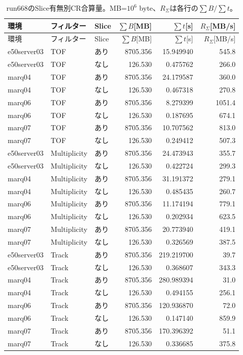 \begingroup\small\begin{longtable}{lllrrr}
\caption{run668のSlice有無別CR合算量。MB=$10^6$ byte、$R_\Sigma$は各行の$\sum B/\sum t$。}\\
\hline 環境 & フィルター & Slice & $\sum B$[MB] & $\sum t$[s] & $R_\Sigma$[MB/s] \\\hline\endfirsthead
\hline 環境 & フィルター & Slice & $\sum B$[MB] & $\sum t$[s] & $R_\Sigma$[MB/s] \\\hline\endhead
e50server03 & TOF & あり & 8705.356 & 15.949940 & 545.8 \\
e50server03 & TOF & なし & 126.530 & 0.475762 & 266.0 \\
marq04 & TOF & あり & 8705.356 & 24.179587 & 360.0 \\
marq04 & TOF & なし & 126.530 & 0.467318 & 270.8 \\
marq06 & TOF & あり & 8705.356 & 8.279399 & 1051.4 \\
marq06 & TOF & なし & 126.530 & 0.187695 & 674.1 \\
marq07 & TOF & あり & 8705.356 & 10.707562 & 813.0 \\
marq07 & TOF & なし & 126.530 & 0.249412 & 507.3 \\
e50server03 & Multiplicity & あり & 8705.356 & 24.473943 & 355.7 \\
e50server03 & Multiplicity & なし & 126.530 & 0.422724 & 299.3 \\
marq04 & Multiplicity & あり & 8705.356 & 31.191372 & 279.1 \\
marq04 & Multiplicity & なし & 126.530 & 0.485435 & 260.7 \\
marq06 & Multiplicity & あり & 8705.356 & 11.174194 & 779.1 \\
marq06 & Multiplicity & なし & 126.530 & 0.202934 & 623.5 \\
marq07 & Multiplicity & あり & 8705.356 & 20.773940 & 419.1 \\
marq07 & Multiplicity & なし & 126.530 & 0.326569 & 387.5 \\
e50server03 & Track & あり & 8705.356 & 219.219700 & 39.7 \\
e50server03 & Track & なし & 126.530 & 0.368607 & 343.3 \\
marq04 & Track & あり & 8705.356 & 280.989394 & 31.0 \\
marq04 & Track & なし & 126.530 & 0.494155 & 256.1 \\
marq06 & Track & あり & 8705.356 & 120.936870 & 72.0 \\
marq06 & Track & なし & 126.530 & 0.147140 & 859.9 \\
marq07 & Track & あり & 8705.356 & 170.396392 & 51.1 \\
marq07 & Track & なし & 126.530 & 0.336685 & 375.8 \\
\hline\end{longtable}\endgroup
